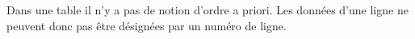 \documentclass[10pt]{article}
\begin{document}
\begin{rem}
Dans une table il n'y a pas de notion d'ordre a priori. Les données d'une ligne ne peuvent donc pas être désignées par un numéro de ligne.
\end{rem}
%
%
%
%
%
%
%
%
%
%
%
%
%
%
%
%
%
%
%
%
\end{document}
